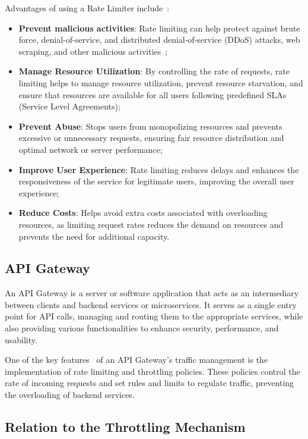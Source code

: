 Advantages of using a Rate Limiter include~\cite{solo-io-rate-limiting, kong-rate-limiting}:

\begin{itemize}
    \item \textbf{Prevent malicious activities}: Rate limiting can help protect against brute force, denial-of-service, and distributed denial-of-service (DDoS) attacks, web scraping, and other malicious activities~\cite{cloudflare-rate-limiting};
    \item \textbf{Manage Resource Utilization}: By controlling the rate of requests, rate limiting helps to manage resource utilization, prevent resource starvation, and ensure that resources are available for all users following predefined SLAs (Service Level Agreements);
    \item \textbf{Prevent Abuse}: Stops users from monopolizing resources and prevents excessive or unnecessary requests, ensuring fair resource distribution and optimal network or server performance;
    \item \textbf{Improve User Experience}: Rate limiting reduces delays and enhances the responsiveness of the service for legitimate users, improving the overall user experience;
    \item \textbf{Reduce Costs}: Helps avoid extra costs associated with overloading resources, as limiting request rates reduces the demand on resources and prevents the need for additional capacity.
\end{itemize}

\subsection{API Gateway}\label{subsec:rate-limiter-api-gateway}

An API Gateway is a server or software application that acts as an intermediary between clients and backend services or microservices.
It serves as a single entry point for API calls, managing and routing them to the appropriate services, while also providing various functionalities to enhance security, performance, and usability.

One of the key features~\cite{api-gateway} of an API Gateway's traffic management is the implementation of rate limiting and throttling policies.
These policies control the rate of incoming requests and set rules and limits to regulate traffic, preventing the overloading of backend services.

\subsection{Relation to the Throttling Mechanism}\label{subsec:rate-limiter-throttling}

